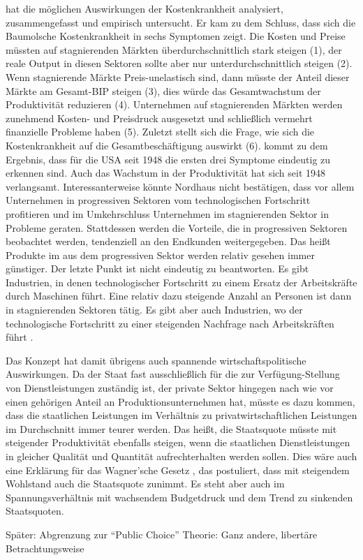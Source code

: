 \textcite{Nordhaus2008} hat die möglichen Auswirkungen der Kostenkrankheit analysiert, zusammengefasst und empirisch untersucht. Er kam zu dem Schluss, dass sich die Baumolsche Kostenkrankheit in sechs Symptomen zeigt. Die Kosten und Preise müssten auf stagnierenden Märkten überdurchschnittlich stark steigen (1), der reale Output in diesen Sektoren sollte aber nur unterdurchschnittlich steigen (2). Wenn stagnierende Märkte Preis-unelastisch sind, dann müsste der Anteil dieser Märkte am Gesamt-BIP steigen (3), dies würde das Gesamtwachstum der Produktivität reduzieren (4). Unternehmen auf stagnierenden Märkten werden zunehmend Kosten- und Preisdruck ausgesetzt und schließlich vermehrt finanzielle Probleme haben (5). Zuletzt stellt sich die Frage, wie sich die Kostenkrankheit auf die Gesamtbeschäftigung auswirkt (6). \textcite{Nordhaus2008} kommt zu dem Ergebnis, dass für die USA seit 1948 die ersten drei Symptome eindeutig zu erkennen sind. Auch das Wachstum in der Produktivität hat sich seit 1948 verlangsamt. Interessanterweise könnte Nordhaus nicht bestätigen, dass vor allem Unternehmen in progressiven Sektoren vom technologischen Fortschritt profitieren und im Umkehrschluss Unternehmen im stagnierenden Sektor in Probleme geraten. Stattdessen werden die Vorteile, die in progressiven Sektoren beobachtet werden, tendenziell an den Endkunden weitergegeben. Das heißt Produkte im aus dem progressiven Sektor werden relativ gesehen immer günstiger. Der letzte Punkt ist nicht eindeutig zu beantworten. Es gibt Industrien, in denen technologischer Fortschritt zu einem Ersatz der Arbeitskräfte durch Maschinen führt. Eine relativ dazu steigende Anzahl an Personen ist dann in stagnierenden Sektoren tätig. Es gibt aber auch Industrien, wo der technologische Fortschritt zu einer steigenden Nachfrage nach Arbeitskräften führt \parencite{Nordhaus2008}.

Das Konzept hat damit übrigens auch spannende wirtschaftspolitische Auswirkungen. Da der Staat fast ausschließlich für die zur Verfügung-Stellung von Dienstleistungen zuständig ist, der private Sektor hingegen nach wie vor einen gehörigen Anteil an Produktionsunternehmen hat, müsste es dazu kommen, dass die staatlichen Leistungen im Verhältnis zu privatwirtschaftlichen Leistungen im Durchschnitt immer teurer werden. Das heißt, die Staatsquote müsste mit steigender Produktivität ebenfalls steigen, wenn die staatlichen Dienstleistungen in gleicher Qualität und Quantität aufrechterhalten werden sollen. Dies wäre auch eine Erklärung für das Wagner'sche Gesetz \parencite{Wagner1892}, das postuliert, dass mit steigendem Wohlstand auch die Staatsquote zunimmt. Es steht aber auch im Spannungsverhältnis mit wachsendem Budgetdruck und dem Trend zu sinkenden Staatsquoten.





Später: Abgrenzung zur "`Public Choice"' Theorie: Ganz andere, libertäre Betrachtungsweise




